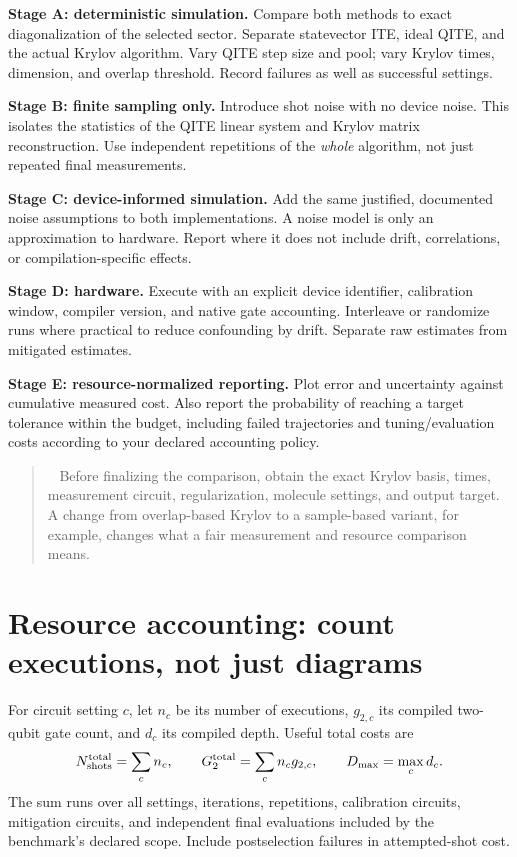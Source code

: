 \documentclass[11pt,a4paper]{article}
\newcommand{\lesson}[2]{\clearpage\section{#1}\label{#2}}
\newenvironment{caution}[1][Important distinction]{\par\smallskip\begin{quotation}\noindent{\bfseries\textcolor{alertred}{#1.}}\ }{\end{quotation}\smallskip}
\begin{document}
\textbf{Stage A: deterministic simulation.} Compare both methods to exact diagonalization of the selected sector. Separate statevector ITE, ideal QITE, and the actual Krylov algorithm. Vary QITE step size and pool; vary Krylov times, dimension, and overlap threshold. Record failures as well as successful settings.

\textbf{Stage B: finite sampling only.} Introduce shot noise with no device noise. This isolates the statistics of the QITE linear system and Krylov matrix reconstruction. Use independent repetitions of the \emph{whole} algorithm, not just repeated final measurements.

\textbf{Stage C: device-informed simulation.} Add the same justified, documented noise assumptions to both implementations. A noise model is only an approximation to hardware. Report where it does not include drift, correlations, or compilation-specific effects.

\textbf{Stage D: hardware.} Execute with an explicit device identifier, calibration window, compiler version, and native gate accounting. Interleave or randomize runs where practical to reduce confounding by drift. Separate raw estimates from mitigated estimates.

\textbf{Stage E: resource-normalized reporting.} Plot error and uncertainty against cumulative measured cost. Also report the probability of reaching a target tolerance within the budget, including failed trajectories and tuning/evaluation costs according to your declared accounting policy.

\begin{caution}[The colleague's configuration is still an input]
Before finalizing the comparison, obtain the exact Krylov basis, times, measurement circuit, regularization, molecule settings, and output target. A change from overlap-based Krylov to a sample-based variant, for example, changes what a fair measurement and resource comparison means.
\end{caution}

\lesson{Resource accounting: count executions, not just diagrams}{sec:resources}
For circuit setting $c$, let $n_c$ be its number of executions, $g_{2,c}$ its compiled two-qubit gate count, and $d_c$ its compiled depth. Useful total costs are
\[
N_{\rm shots}^{\rm total}=\sum_c n_c,\qquad
G_2^{\rm total}=\sum_c n_c g_{2,c},\qquad
D_{\max}=\max_c d_c.
\]
The sum runs over all settings, iterations, repetitions, calibration circuits, mitigation circuits, and independent final evaluations included by the benchmark's declared scope. Include postselection failures in attempted-shot cost.
\end{document}

